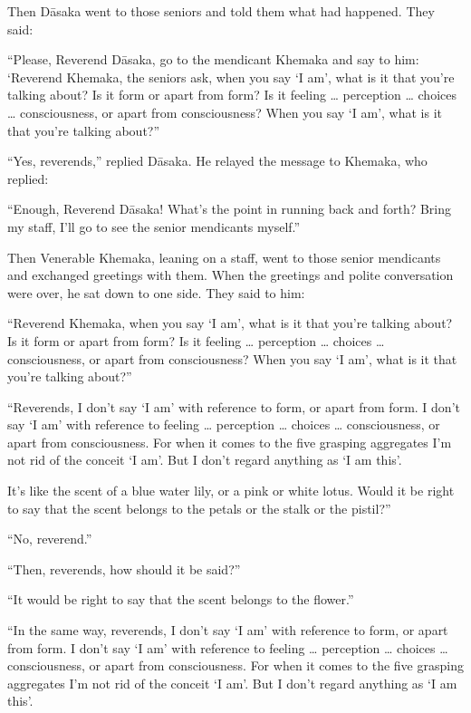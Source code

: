 \documentclass[12pt,openany]{book}%
\begin{document}
Then \textsanskrit{Dāsaka} went to those seniors and told them what had happened. They said: 

“Please, Reverend \textsanskrit{Dāsaka}, go to the mendicant Khemaka and say to him: ‘Reverend Khemaka, the seniors ask, when you say ‘I am’, what is it that you’re talking about? Is it form or apart from form? Is it feeling … perception … choices … consciousness, or apart from consciousness? When you say ‘I am’, what is it that you’re talking about?” 

“Yes, reverends,” replied \textsanskrit{Dāsaka}. He relayed the message to Khemaka, who replied: 

“Enough, Reverend \textsanskrit{Dāsaka}! What’s the point in running back and forth? Bring my staff, I’ll go to see the senior mendicants myself.” 

Then Venerable Khemaka, leaning on a staff, went to those senior mendicants and exchanged greetings with them. When the greetings and polite conversation were over, he sat down to one side. They said to him: 

“Reverend Khemaka, when you say ‘I am’, what is it that you’re talking about? Is it form or apart from form? Is it feeling … perception … choices … consciousness, or apart from consciousness? When you say ‘I am’, what is it that you’re talking about?” 

“Reverends, I don’t say ‘I am’ with reference to form, or apart from form. I don’t say ‘I am’ with reference to feeling … perception … choices … consciousness, or apart from consciousness. For when it comes to the five grasping aggregates I’m not rid of the conceit ‘I am’. But I don’t regard anything as ‘I am this’. 

It’s like the scent of a blue water lily, or a pink or white lotus. Would it be right to say that the scent belongs to the petals or the stalk or the pistil?” 

“No, reverend.” 

“Then, reverends, how should it be said?” 

“It would be right to say that the scent belongs to the flower.” 

“In the same way, reverends, I don’t say ‘I am’ with reference to form, or apart from form. I don’t say ‘I am’ with reference to feeling … perception … choices … consciousness, or apart from consciousness. For when it comes to the five grasping aggregates I’m not rid of the conceit ‘I am’. But I don’t regard anything as ‘I am this’. 
\end{document}
